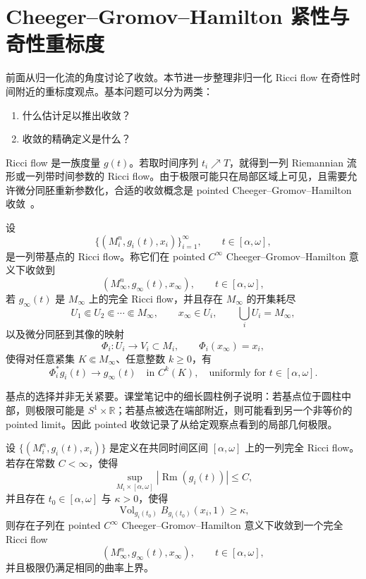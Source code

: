 \documentclass[11pt,a4paper,cn,nofont,math=cm,mode=fancy,bibtex]{elegantbook}
\numberwithin{equation}{chapter}
\numberwithin{figure}{chapter}
\newcommand{\Rm}{\operatorname{Rm}}
\newcommand{\Vol}{\operatorname{Vol}}
\newcommand{\norm}[1]{\left\lvert #1\right\rvert}
\begin{document}
\chapter{Cheeger--Gromov--Hamilton 紧性与奇性重标度}

前面从归一化流的角度讨论了收敛。本节进一步整理非归一化 Ricci flow 在奇性时间附近的重标度观点。基本问题可以分为两类：
\begin{enumerate}[label=\textup{(\arabic*)}]
  \item 什么估计足以推出收敛？
  \item 收敛的精确定义是什么？
\end{enumerate}
Ricci flow 是一族度量 $g(t)$。若取时间序列 $t_i\nearrow T$，就得到一列 Riemannian 流形或一列带时间参数的 Ricci flow。由于极限可能只在局部区域上可见，且需要允许微分同胚重新参数化，合适的收敛概念是 pointed Cheeger--Gromov--Hamilton 收敛~\cite{Hamilton1995Compactness,ChowLuNi2006}。

\begin{defn}
设
\[
  \{(M_i^n,g_i(t),x_i)\}_{i=1}^\infty,
  \qquad t\in[\alpha,\omega],
\]
是一列带基点的 Ricci flow。称它们在 pointed $C^\infty$ Cheeger--Gromov--Hamilton 意义下收敛到
\[
  (M_\infty^n,g_\infty(t),x_\infty),
  \qquad t\in[\alpha,\omega],
\]
若 $g_\infty(t)$ 是 $M_\infty$ 上的完全 Ricci flow，并且存在 $M_\infty$ 的开集耗尽
\[
  U_1\Subset U_2\Subset\cdots\Subset M_\infty,
  \qquad x_\infty\in U_i,
  \qquad \bigcup_i U_i=M_\infty,
\]
以及微分同胚到其像的映射
\[
  \Phi_i:U_i\longrightarrow V_i\subset M_i,
  \qquad \Phi_i(x_\infty)=x_i,
\]
使得对任意紧集 $K\Subset M_\infty$、任意整数 $k\ge0$，有
\[
  \Phi_i^*g_i(t)\longrightarrow g_\infty(t)
  \quad\text{in } C^k(K),
  \quad\text{uniformly for }t\in[\alpha,\omega].
\]
\end{defn}

\begin{rmk}
基点的选择并非无关紧要。课堂笔记中的细长圆柱例子说明：若基点位于圆柱中部，则极限可能是 $S^1\times\mathbb R$；若基点被选在端部附近，则可能看到另一个非等价的 pointed limit。因此 pointed 收敛记录了从给定观察点看到的局部几何极限。
\end{rmk}

\begin{thm}
设 $\{(M_i^n,g_i(t),x_i)\}$ 是定义在共同时间区间 $[\alpha,\omega]$ 上的一列完全 Ricci flow。若存在常数 $C<\infty$，使得
\begin{equation}\label{eq:CGH-curvature-bound}
  \sup_{M_i\times[\alpha,\omega]}\norm{\Rm(g_i(t))}\le C,
\end{equation}
并且存在 $t_0\in[\alpha,\omega]$ 与 $\kappa>0$，使得
\begin{equation}\label{eq:CGH-noncollapse-base}
  \Vol_{g_i(t_0)} B_{g_i(t_0)}(x_i,1)\ge \kappa,
\end{equation}
则存在子列在 pointed $C^\infty$ Cheeger--Gromov--Hamilton 意义下收敛到一个完全 Ricci flow
\[
  (M_\infty^n,g_\infty(t),x_\infty),
  \qquad t\in[\alpha,\omega],
\]
并且极限仍满足相同的曲率上界。
\end{thm}
\end{document}

